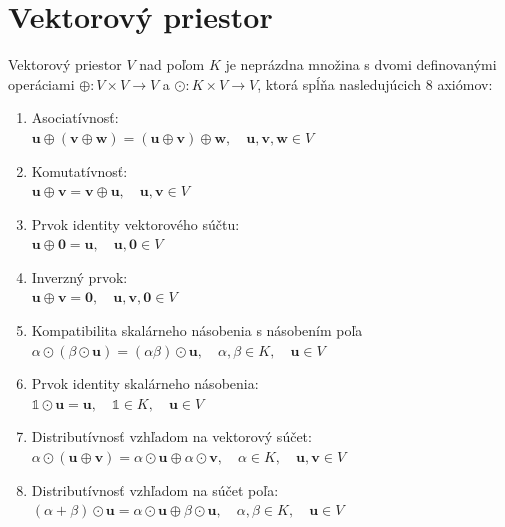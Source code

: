 \documentclass[a4paper, 10pt, ]{article}
\begin{document}
\bigskip

\normalsize
\normalfont

\section{Vektorový priestor}
\label{VectorSpace}

\begin{definition}
    \label{VectorSpace.Definition:VectorSpace}
    Vektorový priestor $V$ nad poľom $K$ je neprázdna množina s dvomi definovanými operáciami $\oplus: V \times V \rightarrow V$  a $\odot: K \times V \rightarrow V$, ktorá spĺňa nasledujúcich 8 axiómov:
    \begin{enumerate}
        \TabPositions{1cm}
        \item Asociatívnosť: \\
        \tab\tab $\bm{u} \oplus (\bm{v} \oplus \bm{w}) = (\bm{u} \oplus \bm{v}) \oplus \bm{w}, \quad \bm{u}, \bm{v}, \bm{w} \in V$
        
        \item Komutatívnosť: \\
        \tab\tab $\bm{u} \oplus \bm{v} = \bm{v} \oplus \bm{u}, \quad \bm{u}, \bm{v} \in V$
        
        \item Prvok identity vektorového súčtu: \\
        \tab\tab $\bm{u} \oplus \bm{0} = \bm{u}, \quad \bm{u}, \bm{0} \in V$
        
        \item Inverzný prvok: \\
        \tab\tab $\bm{u} \oplus \bm{v} = \bm{0}, \quad \bm{u}, \bm{v}, \bm{0} \in V$
        
        \item Kompatibilita skalárneho násobenia s násobením poľa \\
        \tab\tab $\alpha \odot (\beta \odot \bm{u}) = (\alpha \beta) \odot \bm{u}, \quad \alpha, \beta \in K, \quad \bm{u} \in V$
        
        \item Prvok identity skalárneho násobenia: \\
        \tab\tab $\mathbb{1} \odot \bm{u} = \bm{u}, \quad \mathbb{1} \in K, \quad \bm{u} \in V$
        
        \item Distributívnosť vzhľadom na vektorový súčet: \\
        \tab\tab $\alpha \odot (\bm{u} \oplus \bm{v}) = \alpha \odot \bm{u} \oplus \alpha \odot \bm{v}, \quad \alpha \in K, \quad \bm{u}, \bm{v} \in V$
        
        \item Distributívnosť vzhľadom na súčet poľa: \\
        \tab\tab $(\alpha + \beta) \odot \bm{u} = \alpha \odot \bm{u} \oplus \beta \odot \bm{u}, \quad \alpha, \beta \in K, \quad \bm{u} \in V$
    \end{enumerate}
\end{definition}
\end{document}
